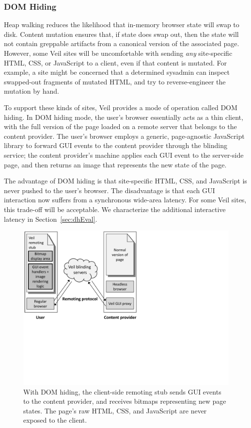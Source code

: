 \subsubsection{DOM Hiding}
\label{sec:domHiding}

Heap walking reduces the likelihood that in-memory browser
state will swap to disk. Content mutation ensures that, if
state does swap out, then the state will not contain greppable
artifacts from a canonical version of the associated page.
However, some Veil sites will be uncomfortable with sending
\emph{any} site-specific HTML, CSS, or JavaScript to a client,
even if that content is mutated. For example, a site might
be concerned that a determined sysadmin can inspect swapped-out
fragments of mutated HTML, and try to reverse-engineer the
mutation by hand.

To support these kinds of sites, Veil provides a mode of
operation called DOM hiding. In DOM hiding mode, the user's
browser essentially acts as a thin client, with the full
version of the page loaded on a remote server that belongs
to the content provider. The user's browser employs a generic,
page-agnostic JavaScript library to forward GUI events to
the content provider through the blinding service; the content
provider's machine applies each GUI event to the server-side
page, and then returns an image that represents the new state
of the page.

The advantage of DOM hiding is that site-specific HTML, CSS,
and JavaScript is never pushed to the user's browser. The
disadvantage is that each GUI interaction now suffers from
a synchronous wide-area latency. For some Veil sites,
this trade-off will be acceptable. We characterize the
additional interactive latency in Section~\ref{sec:dhEval}.

\begin{figure}
	\centering
	\includegraphics[width=\textwidth]{veil-figs/domHiding.pdf}
	\caption[Overview of DOM hiding mode]{With DOM hiding, the client-side remoting stub sends
		GUI events to the content provider, and receives bitmaps
		representing new page states. The page's raw HTML, CSS,
		and JavaScript are never exposed to the client.}
	\label{fig:domHiding}
\end{figure}

